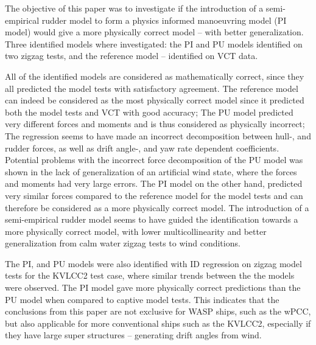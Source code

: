 %
The objective of this paper was to investigate if the introduction of a semi-empirical rudder model to form a physics informed manoeuvring model (PI model) would give a more physically correct model -- with better generalization.
Three identified models where investigated: the PI and PU models identified on two zigzag tests, and the reference model -- identified on VCT data.

All of the identified models are considered as mathematically correct, since they all predicted the model tests with satisfactory agreement.
The reference model can indeed be considered as the most physically correct model since it predicted both the model tests and VCT with good accuracy;
The PU model predicted very different forces and moments and is thus considered as physically incorrect; 
The regression seems to have made an incorrect decomposition between hull-, and rudder forces, as well as drift angle-, and yaw rate dependent coefficients.
Potential problems with the incorrect force decomposition of the PU model was shown in the lack of generalization of an artificial wind state, where the forces and moments had very large errors.
The PI model on the other hand, predicted very similar forces compared to the reference model for the model tests and can therefore be considered as a more physically correct model.
The introduction of a semi-empirical rudder model seems to have guided the identification towards a more physically correct model, with lower multicollinearity and better generalization from calm water zigzag tests to wind conditions.

The PI, and PU models were also identified with ID regression on zigzag model tests for the KVLCC2 test case, where similar trends between the the models were observed. The PI model gave more physically correct predictions than the PU model when compared to captive model tests. This indicates that the conclusions from this paper are not exclusive for WASP ships, such as the wPCC, but also applicable for more conventional ships such as the KVLCC2, especially if they have large super structures -- generating drift angles from wind.

